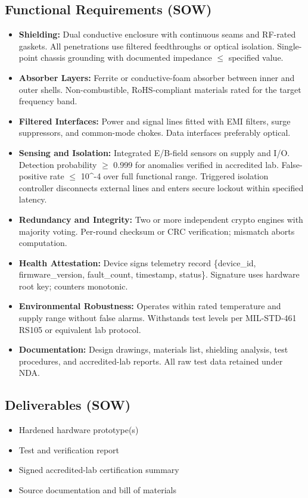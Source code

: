 \documentclass[11pt, a4paper]{article}
\begin{document}
\subsection{Functional Requirements (SOW)}
\begin{itemize}
    \item \textbf{Shielding:} Dual conductive enclosure with continuous seams and RF-rated gaskets. All penetrations use filtered feedthroughs or optical isolation. Single-point chassis grounding with documented impedance $\le$ specified value.
    \item \textbf{Absorber Layers:} Ferrite or conductive-foam absorber between inner and outer shells. Non-combustible, RoHS-compliant materials rated for the target frequency band.
    \item \textbf{Filtered Interfaces:} Power and signal lines fitted with EMI filters, surge suppressors, and common-mode chokes. Data interfaces preferably optical.
    \item \textbf{Sensing and Isolation:} Integrated E/B-field sensors on supply and I/O. Detection probability $\ge$ 0.999 for anomalies verified in accredited lab. False-positive rate $\le$ 10^{-4} over full functional range. Triggered isolation controller disconnects external lines and enters secure lockout within specified latency.
    \item \textbf{Redundancy and Integrity:} Two or more independent crypto engines with majority voting. Per-round checksum or CRC verification; mismatch aborts computation.
    \item \textbf{Health Attestation:} Device signs telemetry record \{device\_id, firmware\_version, fault\_count, timestamp, status\}. Signature uses hardware root key; counters monotonic.
    \item \textbf{Environmental Robustness:} Operates within rated temperature and supply range without false alarms. Withstands test levels per MIL-STD-461 RS105 or equivalent lab protocol.
    \item \textbf{Documentation:} Design drawings, materials list, shielding analysis, test procedures, and accredited-lab reports. All raw test data retained under NDA.
\end{itemize}

\subsection{Deliverables (SOW)}
\begin{itemize}
    \item Hardened hardware prototype(s)
    \item Test and verification report
    \item Signed accredited-lab certification summary
    \item Source documentation and bill of materials
\end{itemize}
\end{document}
